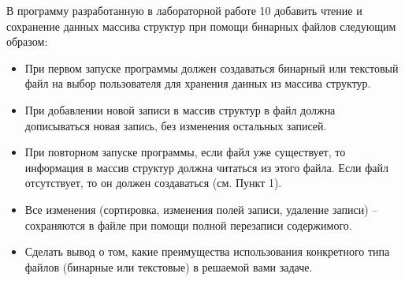В программу разработанную в лабораторной работе 10 добавить чтение и сохранение данных массива структур при помощи бинарных файлов следующим образом:
\begin{itemize}
    \item При первом запуске программы должен создаваться бинарный или текстовый файл на выбор пользователя для хранения данных из массива структур.
    \item При добавлении новой записи в массив структур в файл должна дописываться новая запись, без изменения остальных записей.
    \item При повторном запуске программы, если файл уже существует, то информация в массив структур должна читаться из этого файла. Если файл отсутствует, то он должен создаваться (см. Пункт 1).
    \item Все изменения (сортировка, изменения полей записи, удаление записи) – сохраняются в файле при помощи полной перезаписи содержимого.
    \item Сделать вывод о том, какие преимущества использования конкретного типа файлов (бинарные или текстовые) в решаемой вами задаче.
\end{itemize}
